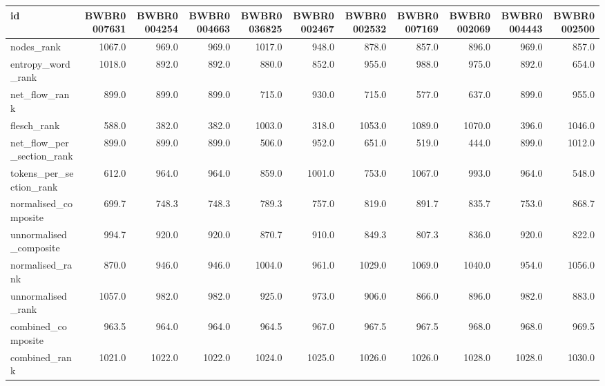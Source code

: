 \begin{tabular}{lrrrrrrrrrr}
\toprule
id & BWBR0007631 & BWBR0004254 & BWBR0004663 & BWBR0036825 & BWBR0002467 & BWBR0002532 & BWBR0007169 & BWBR0002069 & BWBR0004443 & BWBR0002500 \\
\midrule
nodes\_rank & 1067.0 & 969.0 & 969.0 & 1017.0 & 948.0 & 878.0 & 857.0 & 896.0 & 969.0 & 857.0 \\
\cline{1-11}
entropy\_word\_rank & 1018.0 & 892.0 & 892.0 & 880.0 & 852.0 & 955.0 & 988.0 & 975.0 & 892.0 & 654.0 \\
\cline{1-11}
net\_flow\_rank & 899.0 & 899.0 & 899.0 & 715.0 & 930.0 & 715.0 & 577.0 & 637.0 & 899.0 & 955.0 \\
\cline{1-11}
flesch\_rank & 588.0 & 382.0 & 382.0 & 1003.0 & 318.0 & 1053.0 & 1089.0 & 1070.0 & 396.0 & 1046.0 \\
\cline{1-11}
net\_flow\_per\_section\_rank & 899.0 & 899.0 & 899.0 & 506.0 & 952.0 & 651.0 & 519.0 & 444.0 & 899.0 & 1012.0 \\
\cline{1-11}
tokens\_per\_section\_rank & 612.0 & 964.0 & 964.0 & 859.0 & 1001.0 & 753.0 & 1067.0 & 993.0 & 964.0 & 548.0 \\
\cline{1-11}
normalised\_composite & 699.7 & 748.3 & 748.3 & 789.3 & 757.0 & 819.0 & 891.7 & 835.7 & 753.0 & 868.7 \\
\cline{1-11}
unnormalised\_composite & 994.7 & 920.0 & 920.0 & 870.7 & 910.0 & 849.3 & 807.3 & 836.0 & 920.0 & 822.0 \\
\cline{1-11}
normalised\_rank & 870.0 & 946.0 & 946.0 & 1004.0 & 961.0 & 1029.0 & 1069.0 & 1040.0 & 954.0 & 1056.0 \\
\cline{1-11}
unnormalised\_rank & 1057.0 & 982.0 & 982.0 & 925.0 & 973.0 & 906.0 & 866.0 & 896.0 & 982.0 & 883.0 \\
\cline{1-11}
combined\_composite & 963.5 & 964.0 & 964.0 & 964.5 & 967.0 & 967.5 & 967.5 & 968.0 & 968.0 & 969.5 \\
\cline{1-11}
combined\_rank & 1021.0 & 1022.0 & 1022.0 & 1024.0 & 1025.0 & 1026.0 & 1026.0 & 1028.0 & 1028.0 & 1030.0 \\
\cline{1-11}
\bottomrule
\end{tabular}
